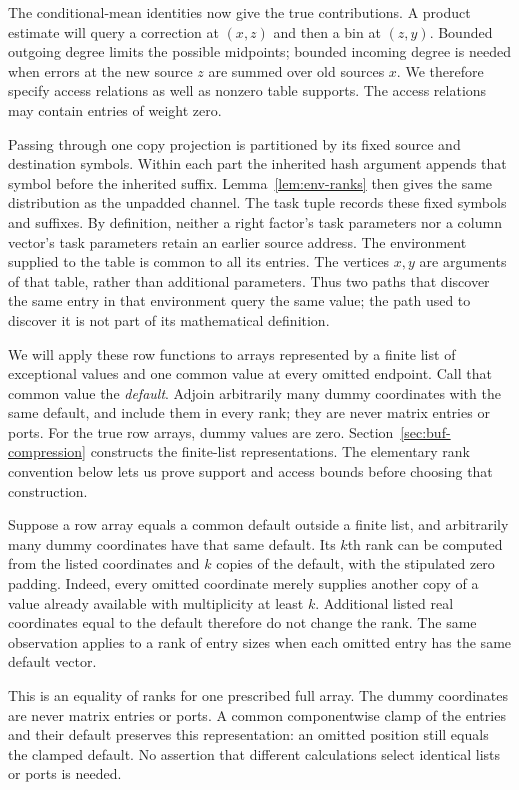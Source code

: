 The conditional-mean identities now give the true contributions.  A
product estimate will query a correction at $(x,z)$ and then a bin at
$(z,y)$.  Bounded outgoing degree limits the possible midpoints; bounded
incoming degree is needed when errors at the new source $z$ are summed
over old sources $x$.  We therefore specify access relations as well as
nonzero table supports.  The access relations may contain entries of
weight zero.

Passing through one copy projection is partitioned by its fixed source and
destination symbols.  Within each part the inherited hash argument
appends that symbol before the inherited suffix.  Lemma~\ref{lem:env-ranks}
then gives the same distribution as the unpadded channel.  The task tuple
records these fixed symbols and suffixes.  By definition, neither a right
factor's task parameters nor a column vector's task parameters retain an
earlier source address.
The environment supplied to the table is common to all its entries.
The vertices $x,y$ are arguments of that table, rather than additional
parameters.  Thus two paths that discover the same entry in that
environment query the same value; the path used to discover it is not
part of its mathematical definition.

We will apply these row functions to arrays represented by a finite list
of exceptional values and one common value at every omitted endpoint.
Call that common value the \emph{default}.  Adjoin arbitrarily many dummy
coordinates with the same default, and include them in every rank; they
are never matrix entries or ports.  For the true row arrays, dummy values
are zero.  Section~\ref{sec:buf-compression} constructs the finite-list
representations.  The elementary rank convention below lets us prove
support and access bounds before choosing that construction.

\begin{remark}
\label{rem:atom-finite-ranks}
Suppose a row array equals a common default outside a finite list,
and arbitrarily many dummy coordinates have that same default.  Its
$k$th rank can be computed from the listed coordinates and $k$ copies of
the default, with the stipulated zero padding.  Indeed, every omitted
coordinate merely supplies another copy of a value already available
with multiplicity at least $k$.  Additional listed real coordinates
equal to the default therefore do not change the rank.  The same
observation applies to a rank of entry sizes when each omitted entry
has the same default vector.

This is an equality of ranks for one prescribed full array.  The dummy
coordinates are never matrix entries or ports.  A common componentwise
clamp of the entries and their default preserves this representation:
an omitted position still equals the clamped default.  No assertion
that different calculations select identical lists or ports is needed.
\end{remark}


